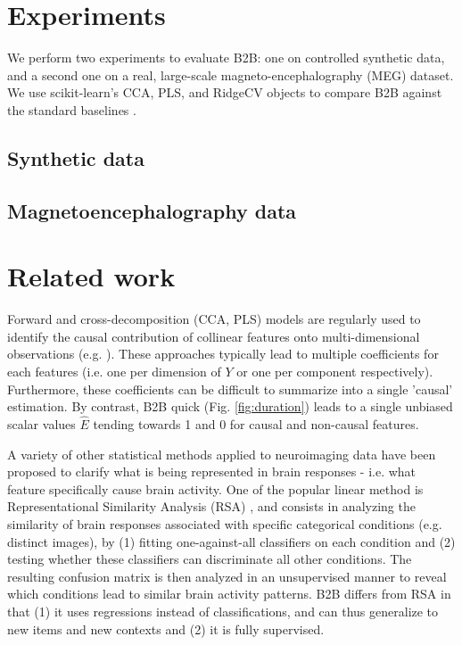 \documentclass{article}
\begin{document}
\section{Experiments}

We perform two experiments to evaluate B2B: one on controlled synthetic data, and a second one on a real, large-scale magneto-encephalography (MEG) dataset.
%
We use scikit-learn's CCA, PLS, and RidgeCV objects to compare B2B against the standard baselines \citep{sklearn}.

\subsection{Synthetic data}
\label{sec:experiment_synthetic}



\subsection{Magnetoencephalography data}
\label{sec:experiment_real}



\section{Related work}

Forward and cross-decomposition (CCA, PLS) models are regularly used to identify the causal contribution of collinear features onto multi-dimensional observations (e.g. \citep{naselaris2011encoding}). These approaches typically lead to multiple coefficients for each features (i.e. one per dimension of $Y$ or one per component respectively). Furthermore, these  coefficients can be difficult to summarize into a single 'causal' estimation. By contrast, B2B quick (Fig. \ref{fig:duration}) leads to a single unbiased scalar values $\hat E$ tending towards 1 and 0 for causal and non-causal features.

A variety of other statistical methods applied to neuroimaging data have been proposed to clarify what is being represented in brain responses - i.e. what feature specifically cause brain activity. One of the popular linear method is Representational Similarity Analysis (RSA) \citep{kriegeskorte2008representational}, and consists in analyzing the similarity of brain responses associated with specific categorical conditions (e.g. distinct images), by (1) fitting one-against-all classifiers on each condition and (2) testing whether these classifiers can discriminate all other conditions. The resulting confusion matrix is then analyzed in an unsupervised manner to reveal which conditions lead to similar brain activity patterns. B2B differs from RSA in that (1) it uses regressions instead of classifications, and can thus generalize to new items and new contexts and (2) it is fully supervised.
\end{document}
